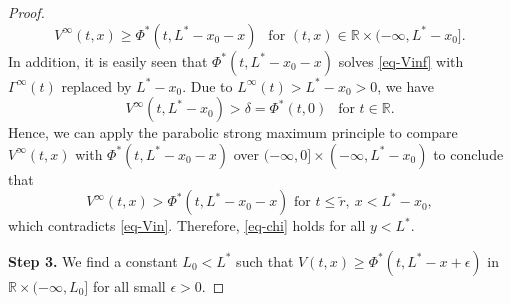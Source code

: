 \documentclass[10pt,a4paper]{amsart}
\begin{document}
\begin{proof}
\begin{equation*}
  V^\infty(t,x)\geq \Phi^*(t,L^*-x_0-x)~~ \text{ for }(t,x)\in\mathbb{R} \times (-\infty, L^*-x_0].
\end{equation*}
In addition, it is easily seen that $\Phi^*(t,L^*-x_0-x)$ solves \eqref{eq-Vinf} with $\Gamma^\infty(t)$ replaced by $L^*-x_0$. Due to $L^\infty(t)>L^*-x_0>0$, we have
\begin{equation*}
  V^\infty(t,L^*-x_0)>\delta=\Phi^*(t,0) ~~\text{ for }t\in\mathbb{R}.
\end{equation*} 
Hence, we can apply the parabolic strong maximum principle to compare $V^\infty(t,x)$ with $\Phi^*(t,L^*-x_0-x)$ over $(-\infty,0]\times (-\infty,L^*-x_0)$ to conclude that 
\begin{equation*}
  V^\infty(t,x) >\Phi^*(t,L^*-x_0-x) \text{ for }t\leq \tilde{r},\ x<L^*-x_0,
\end{equation*}
which contradicts \eqref{eq-Vin}. Therefore, \eqref{eq-chi} holds for all $y< L^*$.

\textbf{Step 3.} We find a constant $L_0<L^*$ such that  $V(t,x)\geq \Phi^*(t,L^*-x+\epsilon)$ in $\mathbb{R}\times(-\infty,L_0]$ for all small $\epsilon>0$.


\end{proof}
\end{document}
